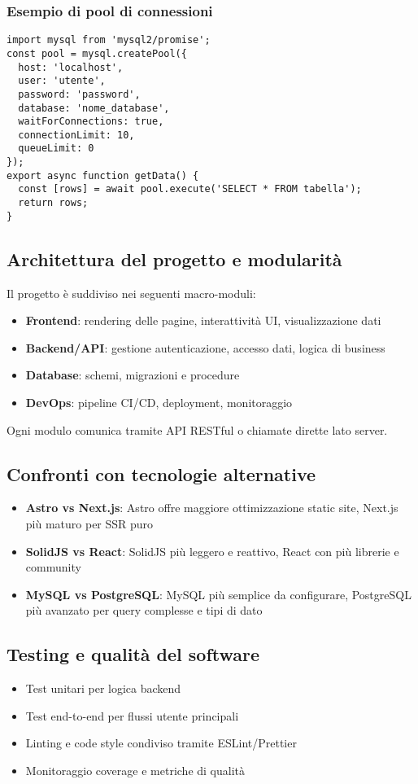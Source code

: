 \subsubsection{Esempio di pool di connessioni}
\begin{verbatim}
import mysql from 'mysql2/promise';
const pool = mysql.createPool({
  host: 'localhost',
  user: 'utente',
  password: 'password',
  database: 'nome_database',
  waitForConnections: true,
  connectionLimit: 10,
  queueLimit: 0
});
export async function getData() {
  const [rows] = await pool.execute('SELECT * FROM tabella');
  return rows;
}
\end{verbatim}

\subsection{Architettura del progetto e modularità}
Il progetto è suddiviso nei seguenti macro-moduli:
\begin{itemize}
    \item \textbf{Frontend}: rendering delle pagine, interattività UI, visualizzazione dati
    \item \textbf{Backend/API}: gestione autenticazione, accesso dati, logica di business
    \item \textbf{Database}: schemi, migrazioni e procedure
    \item \textbf{DevOps}: pipeline CI/CD, deployment, monitoraggio
\end{itemize}
Ogni modulo comunica tramite API RESTful o chiamate dirette lato server.

\subsection{Confronti con tecnologie alternative}
\begin{itemize}
    \item \textbf{Astro vs Next.js}: Astro offre maggiore ottimizzazione static site, Next.js più maturo per SSR puro
    \item \textbf{SolidJS vs React}: SolidJS più leggero e reattivo, React con più librerie e community
    \item \textbf{MySQL vs PostgreSQL}: MySQL più semplice da configurare, PostgreSQL più avanzato per query complesse e tipi di dato
\end{itemize}

\subsection{Testing e qualità del software}
\begin{itemize}
    \item Test unitari per logica backend
    \item Test end-to-end per flussi utente principali
    \item Linting e code style condiviso tramite ESLint/Prettier
    \item Monitoraggio coverage e metriche di qualità
\end{itemize}

